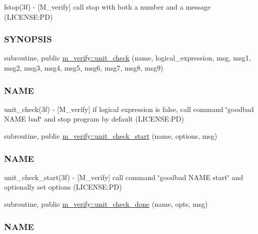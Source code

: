 \begin{DoxyCompactItemize}
\begin{DoxyCompactList}
fstop(3f) -\/ \mbox{[}M\+\_\+verify\mbox{]} call stop with both a number and a message (L\+I\+C\+E\+N\+SE\+:PD) \subsubsection*{S\+Y\+N\+O\+P\+S\+IS}\end{DoxyCompactList}\item 
subroutine, public \mbox{\hyperlink{namespacem__verify_a96149da1a302f2a157d79dadc94e755e}{m\+\_\+verify\+::unit\+\_\+check}} (name, logical\+\_\+expression, msg, msg1, msg2, msg3, msg4, msg5, msg6, msg7, msg8, msg9)
\begin{DoxyCompactList}\small\item\em \subsubsection*{N\+A\+ME}

unit\+\_\+check(3f) -\/ \mbox{[}M\+\_\+verify\mbox{]} if logical expression is false, call command \char`\"{}goodbad N\+A\+M\+E bad\char`\"{} and stop program by default (L\+I\+C\+E\+N\+SE\+:PD) \end{DoxyCompactList}\item 
subroutine, public \mbox{\hyperlink{namespacem__verify_ad753d0a58dbc02c8917bf2b2aa3e1de7}{m\+\_\+verify\+::unit\+\_\+check\+\_\+start}} (name, options, msg)
\begin{DoxyCompactList}\small\item\em \subsubsection*{N\+A\+ME}

unit\+\_\+check\+\_\+start(3f) -\/ \mbox{[}M\+\_\+verify\mbox{]} call command \char`\"{}goodbad N\+A\+M\+E start\char`\"{} and optionally set options (L\+I\+C\+E\+N\+SE\+:PD) \end{DoxyCompactList}\item 
subroutine, public \mbox{\hyperlink{namespacem__verify_a0c0ed723b61b2cbbebb81fa91edd1941}{m\+\_\+verify\+::unit\+\_\+check\+\_\+done}} (name, opts, msg)
\begin{DoxyCompactList}\small\item\em \subsubsection*{N\+A\+ME}


\end{DoxyCompactList}
\end{DoxyCompactItemize}
